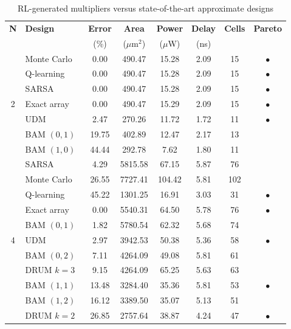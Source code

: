 \begin{table}[htbp]
\centering
\caption{RL-generated multipliers versus state-of-the-art approximate designs}
\label{tab:metrics}

\begin{tabular}{@{}c l c c c c c c@{}}
\toprule
\textbf{N} & \textbf{Design} & \textbf{Error} & \textbf{Area} &
\textbf{Power} & \textbf{Delay} & \textbf{Cells} & \textbf{Pareto} \\
& & (\%) & ($\mu$m$^2$) & ($\mu$W) & (ns) & & \\
\midrule
\multirow{7}{*}{2}
& Monte Carlo & 0.00 & 490.47 & 15.28 & 2.09 & 15 & $\bullet$ \\
& Q-learning & 0.00 & 490.47 & 15.28 & 2.09 & 15 & $\bullet$ \\
& SARSA & 0.00 & 490.47 & 15.28 & 2.09 & 15 & $\bullet$ \\
\cmidrule(l){2-8}
& Exact array & 0.00 & 490.47 & 15.29 & 2.09 & 15 & $\bullet$ \\
& UDM~\cite{kulkarni2011} & 2.47 & 270.26 & 11.72 & 1.72 & 11 & $\bullet$ \\
& BAM $(0,1)$~\cite{mahdiani2010} & 19.75 & 402.89 & 12.47 & 2.17 & 13 &  \\
& BAM $(1,0)$~\cite{mahdiani2010} & 44.44 & 292.78 & 7.62 & 1.80 & 11 &  \\
\midrule
\multirow{13}{*}{4}
& SARSA & 4.29 & 5815.58 & 67.15 & 5.87 & 76 &  \\
& Monte Carlo & 26.55 & 7727.41 & 104.42 & 5.81 & 102 &  \\
& Q-learning & 45.22 & 1301.25 & 16.91 & 3.03 & 31 & $\bullet$ \\
\cmidrule(l){2-8}
& Exact array & 0.00 & 5540.31 & 64.50 & 5.78 & 76 & $\bullet$ \\
& BAM $(0,1)$~\cite{mahdiani2010} & 1.82 & 5780.54 & 62.32 & 5.68 & 74 &  \\
& UDM~\cite{kulkarni2011} & 2.97 & 3942.53 & 50.38 & 5.36 & 58 & $\bullet$ \\
& BAM $(0,2)$~\cite{mahdiani2010} & 7.11 & 4264.09 & 49.08 & 5.81 & 61 &  \\
& DRUM $k{=}3$~\cite{hashemi2015} & 9.15 & 4264.09 & 65.25 & 5.63 & 63 &  \\
& BAM $(1,1)$~\cite{mahdiani2010} & 13.48 & 3284.40 & 35.36 & 5.81 & 53 & $\bullet$ \\
& BAM $(1,2)$~\cite{mahdiani2010} & 16.12 & 3389.50 & 35.07 & 5.13 & 51 &  \\
& DRUM $k{=}2$~\cite{hashemi2015} & 26.85 & 2757.64 & 38.87 & 4.24 & 47 & $\bullet$ \\

\end{tabular}
\end{table}
